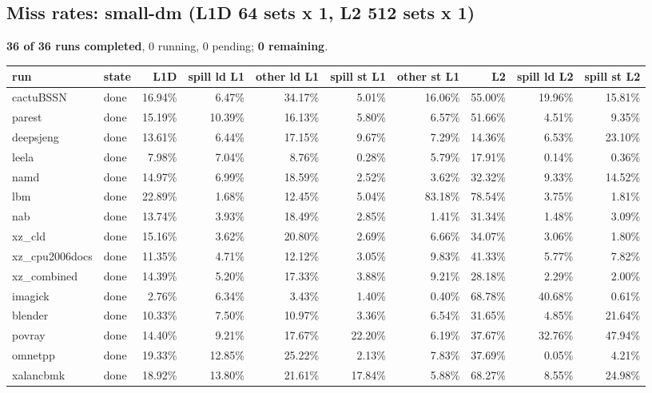 \documentclass[10pt,a4paper,landscape]{article}
\begin{document}
\subsection*{Miss rates: small-dm (L1D 64 sets x 1, L2 512 sets x 1)}
\textbf{36 of 36 runs completed}, 0 running, 0 pending; \textbf{0 remaining}.\par
{\footnotesize
\begin{longtable}{llrrrrrrrr}
\toprule
run & state & L1D & spill ld L1 & other ld L1 & spill st L1 & other st L1 & L2 & spill ld L2 & spill st L2 \\
\midrule
\endhead
\bottomrule
\endfoot
cactuBSSN & done & 16.94\% & 6.47\% & 34.17\% & 5.01\% & 16.06\% & 55.00\% & 19.96\% & 15.81\% \\
parest & done & 15.19\% & 10.39\% & 16.13\% & 5.80\% & 6.57\% & 51.66\% & 4.51\% & 9.35\% \\
deepsjeng & done & 13.61\% & 6.44\% & 17.15\% & 9.67\% & 7.29\% & 14.36\% & 6.53\% & 23.10\% \\
leela & done & 7.98\% & 7.04\% & 8.76\% & 0.28\% & 5.79\% & 17.91\% & 0.14\% & 0.36\% \\
namd & done & 14.97\% & 6.99\% & 18.59\% & 2.52\% & 3.62\% & 32.32\% & 9.33\% & 14.52\% \\
lbm & done & 22.89\% & 1.68\% & 12.45\% & 5.04\% & 83.18\% & 78.54\% & 3.75\% & 1.81\% \\
nab & done & 13.74\% & 3.93\% & 18.49\% & 2.85\% & 1.41\% & 31.34\% & 1.48\% & 3.09\% \\
xz\_cld & done & 15.16\% & 3.62\% & 20.80\% & 2.69\% & 6.66\% & 34.07\% & 3.06\% & 1.80\% \\
xz\_cpu2006docs & done & 11.35\% & 4.71\% & 12.12\% & 3.05\% & 9.83\% & 41.33\% & 5.77\% & 7.82\% \\
xz\_combined & done & 14.39\% & 5.20\% & 17.33\% & 3.88\% & 9.21\% & 28.18\% & 2.29\% & 2.00\% \\
imagick & done & 2.76\% & 6.34\% & 3.43\% & 1.40\% & 0.40\% & 68.78\% & 40.68\% & 0.61\% \\
blender & done & 10.33\% & 7.50\% & 10.97\% & 3.36\% & 6.54\% & 31.65\% & 4.85\% & 21.64\% \\
povray & done & 14.40\% & 9.21\% & 17.67\% & 22.20\% & 6.19\% & 37.67\% & 32.76\% & 47.94\% \\
omnetpp & done & 19.33\% & 12.85\% & 25.22\% & 2.13\% & 7.83\% & 37.69\% & 0.05\% & 4.21\% \\
xalancbmk & done & 18.92\% & 13.80\% & 21.61\% & 17.84\% & 5.88\% & 68.27\% & 8.55\% & 24.98\% \\

\end{longtable}}
\end{document}
